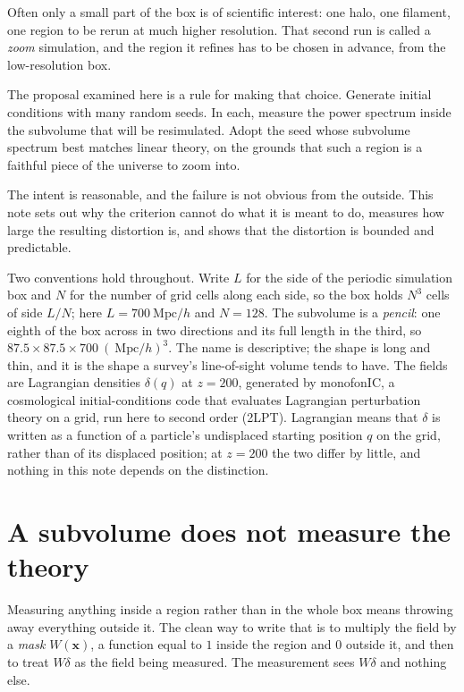 \documentclass[12pt]{article}
\newcommand{\bx}{\mathbf{x}}
\newcommand{\Mpch}{\ \mathrm{Mpc}/h}
\begin{document}
Often only a small part of the box is of scientific interest: one halo, one
filament, one region to be rerun at much higher resolution. That second run is
called a \emph{zoom} simulation, and the region it refines has to be chosen in
advance, from the low-resolution box.

The proposal examined here is a rule for making that choice. Generate initial
conditions with many random seeds. In each, measure the power spectrum inside
the subvolume that will be resimulated. Adopt the seed whose subvolume spectrum
best matches linear theory, on the grounds that such a region is a faithful
piece of the universe to zoom into.

The intent is reasonable, and the failure is not obvious from the outside. This
note sets out why the criterion cannot do what it is meant to do, measures how
large the resulting distortion is, and shows that the distortion is bounded and
predictable.

Two conventions hold throughout. Write $L$ for the side of the periodic
simulation box and $N$ for the number of grid cells along each side, so the box
holds $N^3$ cells of side $L/N$; here $L = 700\Mpch$ and $N = 128$. The
subvolume is a \emph{pencil}: one eighth of the box across in two directions and
its full length in the third, so $87.5 \times 87.5 \times 700\ (\Mpch)^3$. The
name is descriptive; the shape is long and thin, and it is the shape a survey's
line-of-sight volume tends to have. The fields are Lagrangian densities
$\delta(q)$ at $z = 200$, generated by monofonIC, a cosmological
initial-conditions code that evaluates Lagrangian perturbation theory on a grid,
run here to second order (2LPT). Lagrangian means that
$\delta$ is written as a function of a particle's undisplaced starting position
$q$ on the grid, rather than of its displaced position; at $z = 200$ the two
differ by little, and nothing in this note depends on the distinction.

\section{A subvolume does not measure the theory}
\label{sec:window}

Measuring anything inside a region rather than in the whole box means throwing
away everything outside it. The clean way to write that is to multiply the field
by a \emph{mask} $W(\bx)$, a function equal to $1$ inside the region and $0$
outside it, and then to treat $W\delta$ as the field being measured. The
measurement sees $W\delta$ and nothing else.
\end{document}
